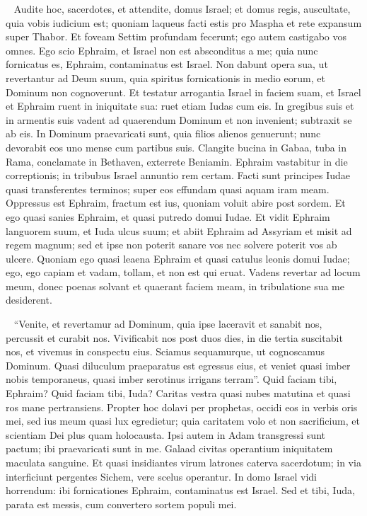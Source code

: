 \begin{biblechapter}   
\verse Audite hoc, sacerdotes, et attendite, domus Israel; et domus regis, auscultate, quia vobis iudicium est; quoniam laqueus facti estis pro Maspha et rete expansum super Thabor. 
\verse Et foveam Settim profundam fecerunt; ego autem castigabo vos omnes. 
\verse Ego scio Ephraim, et Israel non est absconditus a me; quia nunc fornicatus es, Ephraim, contaminatus est Israel. 
\verse Non dabunt opera sua, ut revertantur ad Deum suum, quia spiritus fornicationis in medio eorum, et Dominum non cognoverunt. 
\verse Et testatur arrogantia Israel in faciem suam, et Israel et Ephraim ruent in iniquitate sua: ruet etiam Iudas cum eis. 
\verse In gregibus suis et in armentis suis vadent ad quaerendum Dominum et non invenient; subtraxit se ab eis. 
\verse In Dominum praevaricati sunt, quia filios alienos genuerunt; nunc devorabit eos uno mense cum partibus suis. 
\verse Clangite bucina in Gabaa, tuba in Rama, conclamate in Bethaven, exterrete Beniamin. 
\verse Ephraim vastabitur in die correptionis; in tribubus Israel annuntio rem certam. 
\verse Facti sunt principes Iudae quasi transferentes terminos; super eos effundam quasi aquam iram meam. 
\verse Oppressus est Ephraim, fractum est ius, quoniam voluit abire post sordem. 
\verse Et ego quasi sanies Ephraim, et quasi putredo domui Iudae. 
\verse Et vidit Ephraim languorem suum, et Iuda ulcus suum; et abiit Ephraim ad Assyriam et misit ad regem magnum; sed et ipse non poterit sanare vos nec solvere poterit vos ab ulcere. 
\verse Quoniam ego quasi leaena Ephraim et quasi catulus leonis domui Iudae; ego, ego capiam et vadam, tollam, et non est qui eruat. 
\verse Vadens revertar ad locum meum, donec poenas solvant et quaerant faciem meam, in tribulatione sua me desiderent. 
\end{biblechapter}

\begin{biblechapter}   
\verse “Venite, et revertamur ad Dominum, quia ipse laceravit et sanabit nos, percussit et curabit nos. 
\verse Vivificabit nos post duos dies, in die tertia suscitabit nos, et vivemus in conspectu eius. 
\verse Sciamus sequamurque, ut cognoscamus Dominum. Quasi diluculum praeparatus est egressus eius, et veniet quasi imber nobis temporaneus, quasi imber serotinus irrigans terram”. 
\verse Quid faciam tibi, Ephraim? Quid faciam tibi, Iuda? Caritas vestra quasi nubes matutina et quasi ros mane pertransiens. 
\verse Propter hoc dolavi per prophetas, occidi eos in verbis oris mei, sed ius meum quasi lux egredietur; 
\verse quia caritatem volo et non sacrificium, et scientiam Dei plus quam holocausta. 
\verse Ipsi autem in Adam transgressi sunt pactum; ibi praevaricati sunt in me. 
\verse Galaad civitas operantium iniquitatem maculata sanguine. 
\verse Et quasi insidiantes virum latrones caterva sacerdotum; in via interficiunt pergentes Sichem, vere scelus operantur. 
\verse In domo Israel vidi horrendum: ibi fornicationes Ephraim, contaminatus est Israel. 
\verse Sed et tibi, Iuda, parata est messis, cum convertero sortem populi mei. 
\end{biblechapter}

